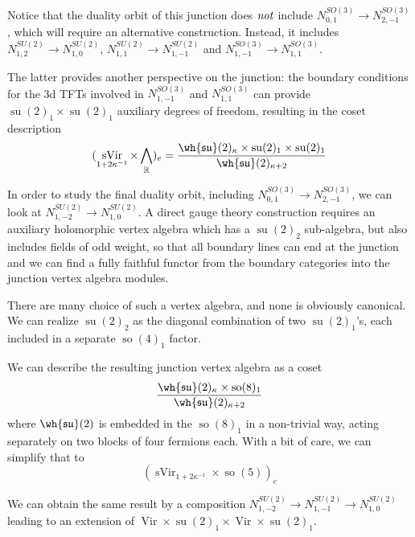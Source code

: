 \documentclass[11pt,reqno]{amsart}
\theoremstyle{plain}
\numberwithin{equation}{section}
\newcommand{\R}{\mathbb{R}}
\DeclareMathOperator{\Vir}{Vir}
\DeclareMathOperator{\sVir}{sVir}
\DeclareMathOperator{\tsu}{su}
\DeclareMathOperator{\tso}{so}
\DeclareMathOperator{\Ff}{\bigwedge_{\R}}
\theoremstyle{definition}
\begin{document}
Notice that the duality orbit of this junction does ${\it not}$ include 
$N^{SO(3)}_{0,1}\to N^{SO(3)}_{2,-1}$, which will require an alternative construction. 
Instead, it includes $N^{SU(2)}_{1,2}\to N^{SU(2)}_{1,0}$, $N^{SU(2)}_{1,1}\to N^{SU(2)}_{1,-1}$
and $N^{SO(3)}_{1,-1}\to N^{SO(3)}_{1,1}$.

The latter provides another perspective on the junction: the boundary conditions for the 
3d TFTs involved in $N^{SO(3)}_{1,-1}$ and $N^{SO(3)}_{1,1}$ can provide 
$\tsu(2)_1 \times \tsu(2)_1$ auxiliary degrees of freedom, resulting in the coset description
$$
( \sVir_{1+2 \kappa^{-1}}  \times \Ff)_e=
\frac{\wh{\mathfrak{su}}(2)_{\kappa} \times
 \tsu(2)_1 \times \tsu(2)_1}{\wh{\mathfrak{su}}(2)_{\kappa+2}}
$$

In order to study the final duality orbit, including $N^{SO(3)}_{0,1}\to N^{SO(3)}_{2,-1}$, 
we can look at $N^{SU(2)}_{1,-2}\to N^{SU(2)}_{1,0}$. A direct gauge theory construction 
requires an auxiliary holomorphic vertex algebra which has a $\tsu(2)_2$ sub-algebra, 
but also includes fields of odd weight, so that all boundary lines can end at the 
junction and we can find a fully faithful functor from the boundary categories into 
the junction vertex algebra modules. 

There are many choice of such a vertex algebra, and none is obviously canonical.
We can realize $\tsu(2)_2$ as the diagonal combination of two $\tsu(2)_1$'s, 
each included in a separate $\tso(4)_1$ factor. 

We can describe the resulting junction vertex algebra as a coset
\begin{equation}
\frac{\wh{\mathfrak{su}}(2)_{\kappa} \times
  \tso(8)_1}{\wh{\mathfrak{su}}(2)_{\kappa+2}}
\end{equation}
where $\wh{\mathfrak{su}}(2)$ is embedded in the $\tso(8)_1$ in a
non-trivial way, acting separately on two blocks of four fermions each.
With a bit of care, we can simplify that to
\begin{equation}
( \sVir_{1+2 \kappa^{-1}}  \times \tso(5))_e
\end{equation}

We can obtain the same result by a composition
$N^{SU(2)}_{1,-2}\to N^{SU(2)}_{1,-1}\to N^{SU(2)}_{1,0}$ leading to
an extension of $\Vir \times \tsu(2)_1 \times \Vir \times \tsu(2)_1$. 
\end{document}

